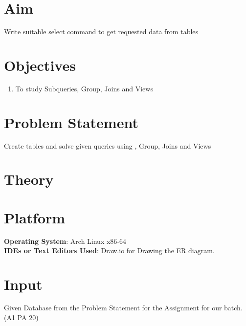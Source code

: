 \documentclass[11pt]{article}
\begin{document}
\tableofcontents
\thispagestyle{empty}
\clearpage

\setcounter{page}{1}

\section{Aim}
Write suitable select command to get requested data from tables

\section{Objectives}
\begin{enumerate}
	\item To study Subqueries, Group, Joins and Views
\end{enumerate}

\section{Problem Statement}
Create tables and solve given queries using , Group, Joins and Views

\section{Theory}







\section{Platform}
\textbf{Operating System}: Arch Linux x86-64 \\
\textbf{IDEs or Text Editors Used}: Draw.io for Drawing the ER diagram.


\section{Input}
Given Database from the Problem Statement for the Assignment for our batch. (A1 PA 20)
\end{document}

